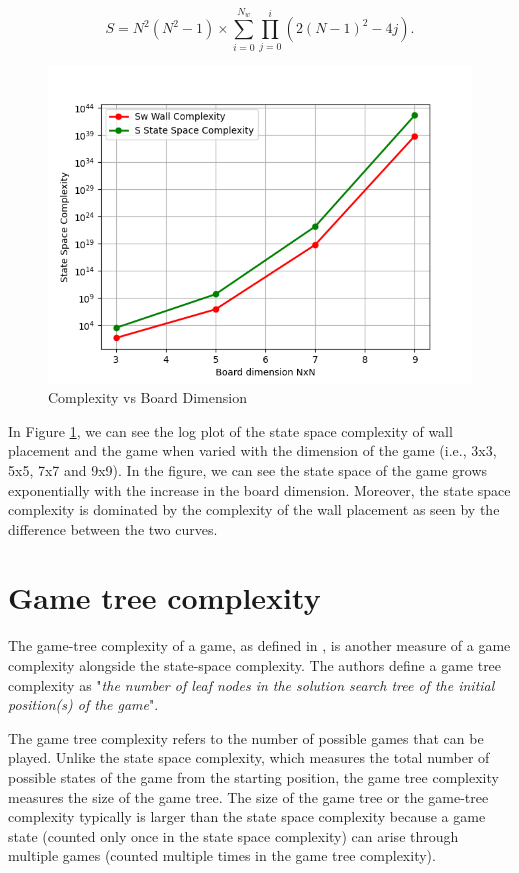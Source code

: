 \begin{equation}
    S = N^2(N^2 -1) \times \sum_{i=0}^{N_w}\prod_{j=0}^{i}(2(N-1)^2 - 4j).
\end{equation}

\begin{figure}[!ht]
    \centering
    \includegraphics[width=.9\linewidth]{../img/Complexity.png}
    \caption{Complexity vs Board Dimension}
    \label{fig:complexity}
\end{figure}

In Figure \ref{fig:complexity}, we can see the log plot of the state space complexity of wall placement and the game when varied with the dimension of the game (i.e., 3x3, 5x5, 7x7 and 9x9). In the figure, we can see the state space of the game grows exponentially with the increase in the board dimension. Moreover, the state space complexity is dominated by the complexity of the wall placement as seen by the difference between the two curves.


\section{Game tree complexity}

The game-tree complexity of a game, as defined in \citep{Allis1994Searching}, is another measure of a game complexity alongside the state-space complexity. The authors define a game tree complexity as "\textit{the number of leaf nodes in the solution search tree of the initial position(s) of the game}".

The game tree complexity refers to the number of possible games that can be played. Unlike the state space complexity, which measures the total number of possible states of the game from the starting position, the game tree complexity measures the size of the game tree. The size of the game tree or the game-tree complexity typically is larger than the state space complexity because a game state (counted only once in the state space complexity) can arise through multiple games (counted multiple times in the game tree complexity).

